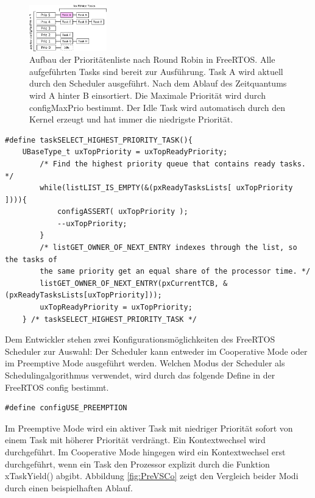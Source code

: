 \begin{figure}[htb]
	\centering
		\includegraphics[width=0.3\textwidth]{Pictures/Scheduling/PrioList1.png}
	\caption{Aufbau der Prioritätenliste nach Round Robin in FreeRTOS. Alle aufgeführten Tasks sind bereit zur Ausführung. Task A wird aktuell durch den Scheduler ausgeführt. Nach dem Ablauf des Zeitquantums wird A hinter B einsortiert. Die Maximale Priorität wird durch configMaxPrio bestimmt. Der Idle Task wird automatisch durch den Kernel erzeugt und hat immer die niedrigste Priorität. }
	\label{fig:PrioList1}
\end{figure}
\begin{lstlisting}[caption={FreeRTOS Source zur Priroty Task Selection aus Task.c. Alle lauffähigen Tasks werden in einem Array verwaltet pxReadyTaskLists. Die Listen verwalten sich durch Referenz-Pointer in den TCBs der einzelnen Tasks}, linewidth=8cm,captionpos=b, label=lst:nextTask, float=hbt]
#define taskSELECT_HIGHEST_PRIORITY_TASK(){																									
	UBaseType_t uxTopPriority = uxTopReadyPriority;														
		/* Find the highest priority queue that contains ready tasks. */								
		while(listLIST_IS_EMPTY(&(pxReadyTasksLists[ uxTopPriority ]))){																								
			configASSERT( uxTopPriority );																
			--uxTopPriority;																			
		}																								
		/* listGET_OWNER_OF_NEXT_ENTRY indexes through the list, so the tasks of						
		the	same priority get an equal share of the processor time. */									
		listGET_OWNER_OF_NEXT_ENTRY(pxCurrentTCB, &(pxReadyTasksLists[uxTopPriority]));			
		uxTopReadyPriority = uxTopPriority;																
	} /* taskSELECT_HIGHEST_PRIORITY_TASK */
\end{lstlisting}
Dem Entwickler stehen zwei Konfigurationsmöglichkeiten des FreeRTOS Scheduler zur Auswahl: Der Scheduler kann entweder im Cooperative Mode oder im Preemptive Mode ausgeführt werden. Welchen Modus der Scheduler als Schedulingalgorithmus verwendet, wird durch das folgende Define in der FreeRTOS config bestimmt.
\begin{lstlisting}[numbers = none]
#define configUSE_PREEMPTION
\end{lstlisting}
Im Preemptive Mode wird ein aktiver Task mit niedriger Priorität sofort von einem Task mit höherer Priorität verdrängt. Ein Kontextwechsel wird durchgeführt. Im Cooperative Mode hingegen wird ein Kontextwechsel erst durchgeführt, wenn ein Task den Prozessor explizit durch die Funktion xTaskYield() abgibt. Abbildung \ref{fig:PreVSCo} zeigt den Vergleich beider Modi durch einen beispielhaften Ablauf. 
